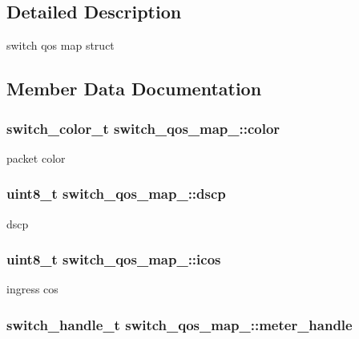 \subsection{Detailed Description}
switch qos map struct 

\subsection{Member Data Documentation}
\hypertarget{structswitch__qos__map___a91dfa0fce73851413436f9522ab81fcf}{
\subsubsection[{color}]{\setlength{\rightskip}{0pt plus 5cm}switch\+\_\+color\+\_\+t switch\+\_\+qos\+\_\+map\+\_\+\+::color}}\label{structswitch__qos__map___a91dfa0fce73851413436f9522ab81fcf}
packet color \hypertarget{structswitch__qos__map___a7f0653e4cdd9ed01f8cea4ac4d50f5f4}{
\subsubsection[{dscp}]{\setlength{\rightskip}{0pt plus 5cm}uint8\+\_\+t switch\+\_\+qos\+\_\+map\+\_\+\+::dscp}}\label{structswitch__qos__map___a7f0653e4cdd9ed01f8cea4ac4d50f5f4}
dscp \hypertarget{structswitch__qos__map___a7c9e6f77a20653e5954c662a05d1fcf9}{
\subsubsection[{icos}]{\setlength{\rightskip}{0pt plus 5cm}uint8\+\_\+t switch\+\_\+qos\+\_\+map\+\_\+\+::icos}}\label{structswitch__qos__map___a7c9e6f77a20653e5954c662a05d1fcf9}
ingress cos \hypertarget{structswitch__qos__map___af751ab6735d72f9c30a4b722ca9ccc36}{
\subsubsection[{meter\+\_\+handle}]{\setlength{\rightskip}{0pt plus 5cm}switch\+\_\+handle\+\_\+t switch\+\_\+qos\+\_\+map\+\_\+\+::meter\+\_\+handle}}\label{structswitch__qos__map___af751ab6735d72f9c30a4b722ca9ccc36}
